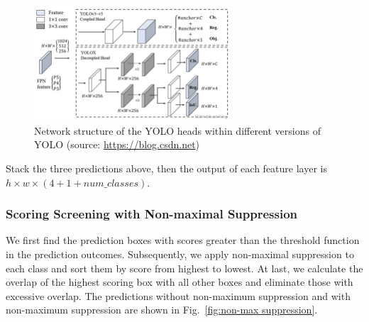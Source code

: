 \begin{figure}[htb]
    \centering
    \includegraphics[width=0.65\textwidth]{images/YoloHead.png}
    \caption{Network structure of the YOLO heads within different versions of YOLO (source: \url{https://blog.csdn.net})}
    \label{fig:YOLO head}
\end{figure}

Stack the three predictions above, then the output of each feature layer is $h\times w\times (4 + 1 + num\_classes)$.


\subsubsection{Scoring Screening with Non-maximal Suppression}
We first find the prediction boxes with scores greater than the threshold function in the prediction outcomes. Subsequently, we apply non-maximal suppression to each class and sort them by score from highest to lowest. At last, we calculate the overlap of the highest scoring box with all other boxes and eliminate those with excessive overlap. The predictions without non-maximum suppression and with non-maximum suppression are shown in Fig.~\ref{fig:non-max suppression}.

